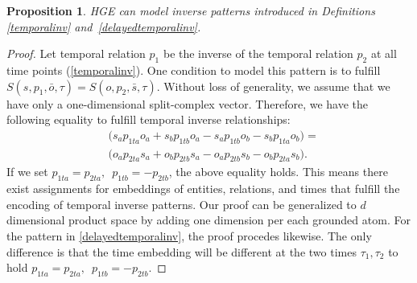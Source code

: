 \documentclass[letterpaper]{article} %
\newtheorem{proposition}{Proposition}
\begin{document}
\begin{proposition}
HGE can model inverse patterns introduced in Definitions \ref{temporalinv} and~\ref{delayedtemporalinv}.
\label{th1:tempinv}
\end{proposition}
\begin{proof}
Let temporal relation $p_1$ be the inverse of the temporal relation $p_2$ at all time points (\ref{temporalinv}).
One condition to model this pattern is to fulfill $S(s,p_1,\bar{o},\tau) =  S(o,p_2,\bar{s},\tau).$
Without loss of generality, we assume that we have only a one-dimensional split-complex vector.
Therefore, we have the following equality to fulfill temporal inverse relationships:
\begin{equation*}
\begin{split}
    &\big( s_a p_{1ta} o_{a} + s_b p_{1tb} o_{a} - s_a p_{1tb} o_{b} - s_b p_{1ta} o_{b}\big) = \\
    &\big( o_a p_{2ta} s_{a} + o_b p_{2tb} s_{a} - o_a p_{2tb} s_{b} - o_b p_{2ta} s_{b} \big).
\end{split}
\end{equation*}
If we set $p_{1ta}  = p_{2ta},\,\,\, p_{1tb}  = -p_{2tb}$, the above equality holds. This means there exist assignments for embeddings of entities, relations, and times that fulfill the encoding of temporal inverse patterns.
Our proof can be generalized to $d$ dimensional product space by adding one dimension per each grounded atom. For the pattern in \ref{delayedtemporalinv}, the proof procedes likewise.
The only difference is that the time embedding will be different at the two times $\tau_1, \tau_2$ to hold $p_{1ta}  = p_{2ta},\,\,\, p_{1tb}  = -p_{2tb}$.
\end{proof}
\end{document}

